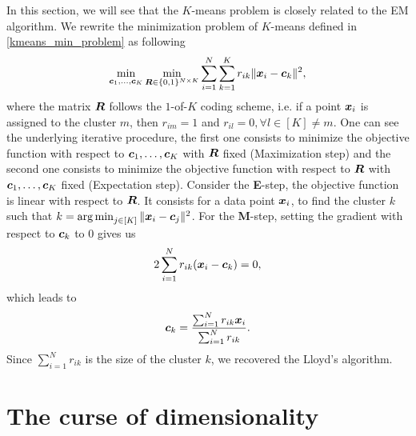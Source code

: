 In this section, we will see that the $K$-means problem is closely related to the EM algorithm. We rewrite the minimization problem of $K$-means defined in \cref{kmeans_min_problem} as following
\begin{equation}
  \min_{\boldsymbol c_1,\dots,\boldsymbol c_K}\min_{\boldsymbol R \in \{0,1\}^{N\times K}}\sum_{i=1}^N\sum_{k=1}^K r_{ik}\|\boldsymbol x_i - \boldsymbol c_k \|^2,
\end{equation}
where the matrix $\boldsymbol R$ follows the $1$-of-$K$ coding scheme, i.e. if a point $\boldsymbol x_i$ is assigned to the cluster $m$, then $r_{im}=1$ and $r_{il}=0, \forall l\in [K] \neq m$. One can see the underlying iterative procedure, the first one consists to minimize the objective function with respect to $\boldsymbol c_1,\dots,\boldsymbol c_K$ with $\boldsymbol R$ fixed (Maximization step) and the second one consists to minimize the objective function with respect to $\boldsymbol R$ with $\boldsymbol c_1,\dots,\boldsymbol c_K$ fixed (Expectation step). Consider the \textbf{E}-step, the objective function is linear with respect to $\boldsymbol R$.  It consists for a data point $\boldsymbol x_i$, to find the cluster $k$ such that $k = \operatorname*{arg\,min}_{j\in[K]}\|\boldsymbol x_i-\boldsymbol c_j\|^2$. For the \textbf{M}-step, setting the gradient with respect to $\boldsymbol c_k$ to 0 gives us
\begin{equation}
  2\sum_{i=1}^N r_{ik} (\boldsymbol x_i-\boldsymbol c_k) = 0,
\end{equation}
which leads to
\begin{equation}
  \boldsymbol c_k = \frac{\sum_{i=1}^N r_{ik}\boldsymbol x_i}{\sum_{i=1}^N r_{ik}}.
\end{equation}
Since $\sum_{i=1}^Nr_{ik}$ is the size of the cluster $k$, we recovered the Lloyd's algorithm.

\section{The curse of dimensionality}
\label{curse_dim_section}

